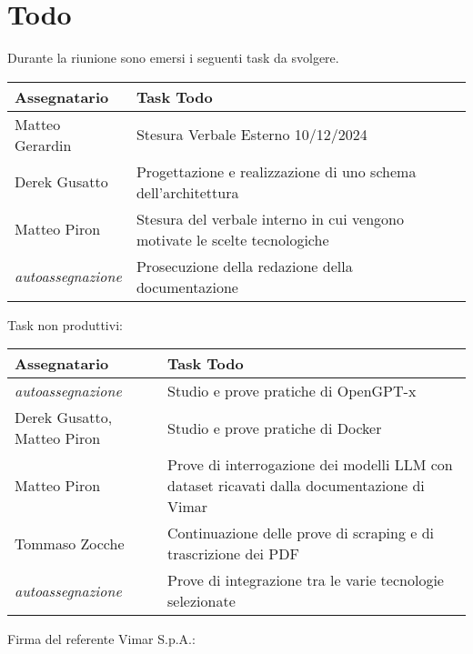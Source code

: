 \section{Todo}
Durante la riunione sono emersi i seguenti task da svolgere.

\begin{center}
  \begin{tabular}{|L{5cm}|L{8cm}|}
    \hline
    \textbf{Assegnatario} & \textbf{Task Todo} \\ \hline
    Matteo Gerardin   &  Stesura Verbale Esterno 10/12/2024\\ \hline
    Derek Gusatto & Progettazione e realizzazione di uno schema dell'architettura\\ \hline
    Matteo Piron & Stesura del verbale interno in cui vengono motivate le scelte tecnologiche\\ \hline
    \textit{autoassegnazione} & Prosecuzione della redazione della documentazione\\ \hline
  \end{tabular}
\end{center}

Task non produttivi:

\begin{center}
  \begin{tabular}{|L{5cm}|L{8cm}|}
    \hline
    \textbf{Assegnatario} & \textbf{Task Todo} \\ \hline
    \textit{autoassegnazione} & Studio e prove pratiche di OpenGPT-x\\ \hline
    Derek Gusatto, Matteo Piron & Studio e prove pratiche di Docker\\ \hline
    Matteo Piron & Prove di interrogazione dei modelli LLM con dataset ricavati dalla documentazione di Vimar\\ \hline
    Tommaso Zocche & Continuazione delle prove di scraping e di trascrizione dei PDF\\ \hline
    \textit{autoassegnazione} & Prove di integrazione tra le varie tecnologie selezionate\\ \hline
  \end{tabular}
\end{center}
\vspace{4cm}
\noindent Firma del referente Vimar S.p.A.: \underline{\hspace{5cm}}